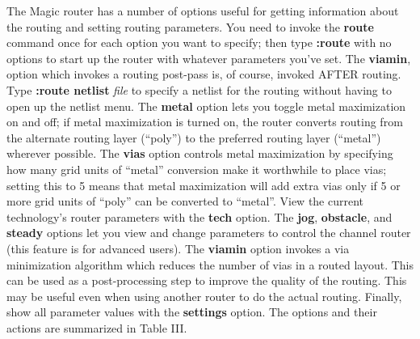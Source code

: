 \documentclass[letterpaper,twoside,12pt]{article}
\begin{document}
The Magic router has a number of options useful for
getting information about the routing and setting routing parameters.  
You need to invoke the {\bfseries route} command once for each option you
want to specify; then type {\bfseries :route} with no options to
start up the router with whatever parameters you've set.  The {\bfseries viamin},
option which invokes a routing post-pass is, of course, 
invoked AFTER routing.
Type {\bfseries :route netlist} {\itshape file} to specify a netlist for the routing
without having to open up the netlist menu.
The {\bfseries metal} option lets you toggle metal maximization on and off;
if metal maximization is turned on, the router converts routing
from the alternate routing layer (``poly'') to the
preferred routing layer (``metal'') wherever possible.
The {\bfseries vias} option controls metal maximization by specifying how many
grid units of ``metal'' conversion make it worthwhile to place vias;
setting this to 5 means that metal maximization will add extra vias only
if 5 or more grid units of ``poly'' can be converted to ``metal''.
View the current technology's router parameters with the {\bfseries tech} option.
The {\bfseries jog}, {\bfseries obstacle}, and {\bfseries steady} options let you view and
change parameters to control the channel router (this feature is for
advanced users).
The {\bfseries viamin} option invokes a via minimization algorithm
which reduces the number of vias in a routed layout.
This can be used as a post-processing step to improve the quality
of the routing.  This may be useful even when using another router
to do the actual routing.  Finally, show all parameter values 
with the {\bfseries settings} option.
The options and their actions are summarized in Table III.
\end{document}

